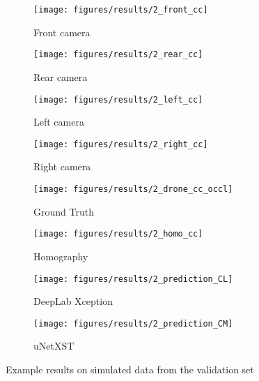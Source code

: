 \documentclass[a4paper, 10pt, conference]{ieeeconf}
\begin{document}
\begin{figure*}[!t]
  \vspace{0.5\baselineskip}
  \captionsetup[subfigure]{skip=0pt}
  \begin{subfigure}[b]{0.2425\textwidth}
    \caption*{Front camera}
    \texttt{[image: figures/results/2\_front\_cc]}
  \end{subfigure}
  \hfill
  \begin{subfigure}[b]{0.2425\textwidth}
    \caption*{Rear camera}
    \texttt{[image: figures/results/2\_rear\_cc]}
  \end{subfigure}
  \hfill
  \begin{subfigure}[b]{0.2425\textwidth}
    \caption*{Left camera}
    \texttt{[image: figures/results/2\_left\_cc]}
  \end{subfigure}
  \hfill
  \begin{subfigure}[b]{0.2425\textwidth}
    \caption*{Right camera}
    \texttt{[image: figures/results/2\_right\_cc]}
  \end{subfigure}

  \vspace{0.5\baselineskip}
  \captionsetup[subfigure]{skip=2pt}
  \begin{subfigure}[b]{0.2425\textwidth}
    \texttt{[image: figures/results/2\_drone\_cc\_occl]}
    \caption*{Ground Truth}
  \end{subfigure}
  \hfill
  \begin{subfigure}[b]{0.2425\textwidth}
    \texttt{[image: figures/results/2\_homo\_cc]}
    \caption*{Homography}
  \end{subfigure}
  \hfill
  \begin{subfigure}[b]{0.2425\textwidth}
    \texttt{[image: figures/results/2\_prediction\_CL]}
    \caption*{DeepLab Xception}
  \end{subfigure}
  \hfill
  \begin{subfigure}[b]{0.2425\textwidth}
    \texttt{[image: figures/results/2\_prediction\_CM]}
    \caption*{uNetXST}
  \end{subfigure}\caption{Example results on simulated data from the validation set}
  \label{fig:Results}
\end{figure*}
\end{document}

